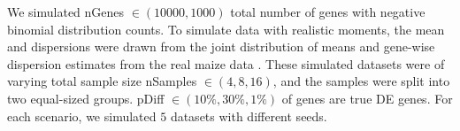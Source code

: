 We simulated nGenes $\in (10000, 1000)$ total number of genes with negative binomial distribution counts. To simulate data with realistic moments, the mean and dispersions were drawn from the joint distribution of means and gene-wise dispersion estimates from the real maize data \citep{paschold2012complementation}. These simulated datasets were of varying total sample size nSamples $\in {(4,8,16)}$, and the samples were split into two equal-sized groups. pDiff $\in {(10\%, 30\%, 1\%)}$ of genes are true DE genes. For each scenario, we simulated $5$ datasets with different seeds.









